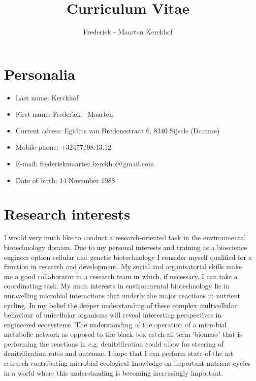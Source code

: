 \documentclass[a4paper,11pt,oneside]{article}
\title{Curriculum Vitae}
\author{Frederiek - Maarten Kerckhof}
\begin{document}
\maketitle

\section{Personalia}
\begin{itemize}
  \item Last name: Kerckhof
  \item First name: Frederiek - Maarten
  \item Current adress: Egidius van Bredenestraat 6, 8340 Sijsele (Damme)
  \item Mobile phone: +32477/98.13.12
  \item E-mail: frederiekmaarten.kerckhof@gmail.com
  \item Date of birth: 14 November 1988
\end{itemize}
\section{Research interests}
I would very much like to conduct a research-oriented task in the environmental biotechnology domain. Due to my personal interests and training as a bioscience engineer option cellular and genetic biotechnology I consider myself qualified for a function in research and development. My social and organisatorial skills make me a good collaborator in a research team in which, if necessary, I can take a coordinating task. My main interests in environmental biotechnology lie in unravelling microbial interactions that underly the major reactions in nutrient cycling. In my belief the deeper understanding of these complex multicellular behaviour of unicellular organisms will reveal interesting perspectives in engineered ecosystems. The understanding of the operation of a microbial metabolic network  as opposed to the black-box catch-all term 'biomass' that is performing the reactions in e.g. denitrification could allow for steering of denitrification rates and outcome. I hope that I can perform state-of-the art research contributing microbial ecological knowledge on important nutrient cycles in a world where this understanding is becoming increasingly important.
\end{document}
